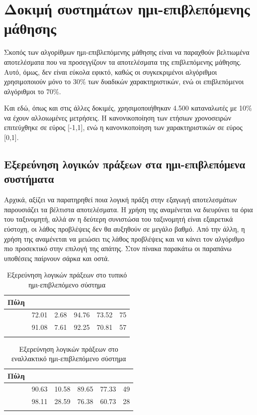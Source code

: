 \section{Δοκιμή συστημάτων ημι-επιβλεπόμενης μάθησης}
Σκοπός των αλγορίθμων ημι-επιβλεπόμενης μάθησης είναι να παραχθούν βελτιωμένα αποτελέσματα που να προσεγγίζουν τα αποτελέσματα της επιβλεπόμενης μάθησης. Αυτό, όμως, δεν είναι εύκολα εφικτό, καθώς οι συγκεκριμένοι αλγόριθμοι χρησιμοποιούν μόνο το 30\% των δυαδικών χαρακτηριστικών, ενώ οι επιβλεπόμενοι αλγόριθμοι το 70\%.\par
Και εδώ, όπως και στις άλλες δοκιμές, χρησιμοποιήθηκαν 4.500 καταναλωτές με 10\% να έχουν αλλοιωμένες μετρήσεις.  Η κανονικοποίηση των ετήσιων χρονοσειρών επιτεύχθηκε σε εύρος [-1,1], ενώ η κανονικοποίηση των χαρακτηριστικών σε εύρος [0,1].
\subsection{Εξερεύνηση λογικών πράξεων στα ημι-επιβλεπόμενα συστήματα}
Αρχικά, αξίζει να παρατηρηθεί ποια λογική πράξη στην εξαγωγή αποτελεσμάτων παρουσιάζει τα βέλτιστα αποτελέσματα. Η χρήση της  αναμένεται να διευρύνει τα όρια του ταξινομητή, αλλά αν η δεύτερη συνιστώσα του ταξινομητή είναι εξαιρετικά εύστοχη, οι λάθος προβλέψεις δεν θα αυξηθούν σε μεγάλο βαθμό. Από την άλλη, η χρήση της  αναμένεται να μειώσει τις λάθος προβλέψεις και να κάνει τον αλγόριθμο πιο προσεκτικό στην επιλογή της απάτης. Στον πίνακα παρακάτω οι παραπάνω υποθέσεις παίρνουν σάρκα και οστά.
\begin{center}
\begin{longtabu} to 0.8\textwidth { | X[c] || X[c] | X[c] | X[c] | X[c] | X[c] |  }
 \hline
 Πύλη &   &  &  &  & \\
\hline
  & 72.01 & 2.68 & 94.76 & 73.52 & 75\\
 \hline
 & 91.08 & 7.61 &  92.25 & 70.81 & 57\\ 
\hline
\caption{Εξερεύνηση λογικών πράξεων στο τυπικό ημι-επιβλεπόμενο σύστημα}
\label{tab:testlogicopersemisup1}
\end{longtabu}
\end{center}

\begin{center}
\begin{longtabu} to 0.8\textwidth { | X[c] || X[c] | X[c] | X[c] | X[c] | X[c] |  }
 \hline
 Πύλη &   &  &  &  & \\
\hline
  & 90.63 & 10.58 & 89.65 & 77.33 & 49\\
 \hline
 & 98.11 & 28.59 & 76.38 & 60.73 & 28\\ 
\hline
\caption{Εξερεύνηση λογικών πράξεων στο εναλλακτικό ημι-επιβλεπόμενο σύστημα}
\label{tab:testlogicopersemisup2}
\end{longtabu}
\end{center}


